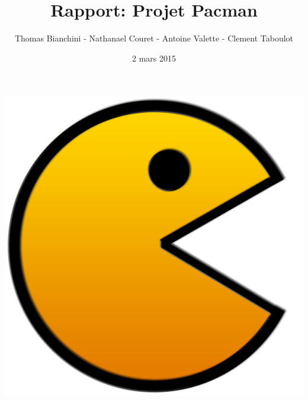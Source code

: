 \documentclass{article}
\author{Thomas Bianchini - Nathanael Couret - Antoine Valette - Clement Taboulot}
\title{Rapport: \linebreak Projet Pacman}
\date{2 mars 2015}
\begin{document}
\maketitle

\centerline{\includegraphics[scale=0.3]{pics/Pacman_HD}}

\pagebreak

\tableofcontents

\pagebreak






\end{document}
